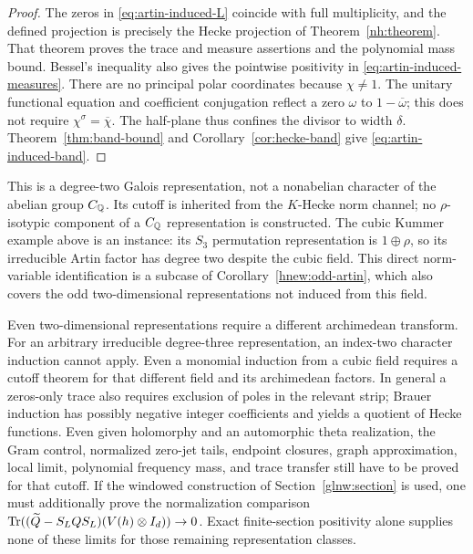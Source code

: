 \begin{proof}
The zeros in \eqref{eq:artin-induced-L} coincide with full
multiplicity, and the defined projection is precisely the
Hecke projection of Theorem~\ref{nh:theorem}. That theorem
proves the trace and measure assertions and the polynomial
mass bound. Bessel's inequality also gives the pointwise
positivity in \eqref{eq:artin-induced-measures}.
There are no principal polar coordinates because $\chi\ne1$.
The unitary functional equation and coefficient conjugation
reflect a zero $\omega$ to $1-\overline\omega$; this does not
require $\chi^\sigma=\overline\chi$.
The half-plane thus confines the divisor to width $\delta$.
Theorem~\ref{thm:band-bound} and Corollary~\ref{cor:hecke-band}
give \eqref{eq:artin-induced-band}.
\end{proof}

This is a degree-two Galois representation, not a nonabelian
character of the abelian group $C_\mathbb Q$. Its cutoff is inherited
from the $K$-Hecke norm channel; no $\rho$-isotypic component
of a $C_\mathbb Q$ representation is constructed.
The cubic Kummer example above is an instance: its $S_3$
permutation representation is $1\oplus\rho$, so its irreducible
Artin factor has degree two despite the cubic field.
This direct norm-variable identification is a subcase of
Corollary~\ref{hnew:odd-artin}, which also covers the odd
two-dimensional representations not induced from this field.

Even two-dimensional representations require a different
archimedean transform. For an arbitrary irreducible degree-three representation,
an index-two character induction cannot apply. Even a monomial
induction from a cubic field requires a cutoff theorem for that
different field and its archimedean factors.
In general a zeros-only trace also requires exclusion of poles
in the relevant strip; Brauer induction has possibly negative
integer coefficients and yields a quotient of Hecke functions.
Even given holomorphy and an automorphic theta realization,
the Gram control, normalized zero-jet tails, endpoint
closures, graph approximation, local limit, polynomial frequency
mass, and trace transfer still have to be proved for that cutoff.
If the windowed construction of Section~\ref{glnw:section} is used,
one must additionally prove the normalization comparison
$\operatorname{Tr}((\widetilde Q-S_LQS_L)(V(h)\otimes I_d))\to0$.
Exact finite-section positivity alone supplies none of these
limits for those remaining representation classes.
